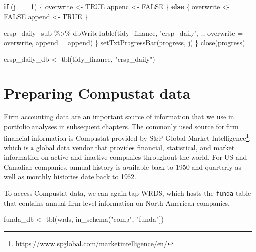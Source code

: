 \documentclass[
]{krantz}
\newenvironment{Shaded}{\begin{snugshade}}{\end{snugshade}}
\newcommand{\AttributeTok}[1]{\textcolor[rgb]{0.61,0.61,0.61}{#1}}
\newcommand{\ConstantTok}[1]{\textcolor[rgb]{0,0,0}{#1}}
\newcommand{\ControlFlowTok}[1]{\textcolor[rgb]{0.27,0.27,0.27}{\textbf{#1}}}
\newcommand{\DecValTok}[1]{\textcolor[rgb]{0.06,0.06,0.06}{#1}}
\newcommand{\FunctionTok}[1]{\textcolor[rgb]{0,0,0}{#1}}
\newcommand{\NormalTok}[1]{#1}
\newcommand{\OtherTok}[1]{\textcolor[rgb]{0.37,0.37,0.37}{#1}}
\newcommand{\SpecialCharTok}[1]{\textcolor[rgb]{0,0,0}{#1}}
\newcommand{\StringTok}[1]{\textcolor[rgb]{0.5,0.5,0.5}{#1}}
\renewcommand{\href}[2]{#2\footnote{\url{#1}}}
\begin{document}
\begin{Shaded}
\begin{Highlighting}[]
    \ControlFlowTok{if}\NormalTok{ (j }\SpecialCharTok{==} \DecValTok{1}\NormalTok{) \{}
\NormalTok{      overwrite }\OtherTok{\textless{}{-}} \ConstantTok{TRUE}
\NormalTok{      append }\OtherTok{\textless{}{-}} \ConstantTok{FALSE}
\NormalTok{    \} }\ControlFlowTok{else}\NormalTok{ \{}
\NormalTok{      overwrite }\OtherTok{\textless{}{-}} \ConstantTok{FALSE}
\NormalTok{      append }\OtherTok{\textless{}{-}} \ConstantTok{TRUE}
\NormalTok{    \}}

\NormalTok{    crsp\_daily\_sub }\SpecialCharTok{\%\textgreater{}\%}
      \FunctionTok{dbWriteTable}\NormalTok{(tidy\_finance, }\StringTok{"crsp\_daily"}\NormalTok{, ., }\AttributeTok{overwrite =}\NormalTok{ overwrite, }\AttributeTok{append =}\NormalTok{ append)}
\NormalTok{  \}}
  \FunctionTok{setTxtProgressBar}\NormalTok{(progress, j)}
\NormalTok{\}}
\FunctionTok{close}\NormalTok{(progress)}

\NormalTok{crsp\_daily\_db }\OtherTok{\textless{}{-}} \FunctionTok{tbl}\NormalTok{(tidy\_finance, }\StringTok{"crsp\_daily"}\NormalTok{)}
\end{Highlighting}
\end{Shaded}

\hypertarget{preparing-compustat-data}{%
\section{Preparing Compustat data}\label{preparing-compustat-data}}

Firm accounting data are an important source of information that we use in portfolio analyses in subsequent chapters. The commonly used source for firm financial information is Compustat provided by \href{https://www.spglobal.com/marketintelligence/en/}{S\&P Global Market Intelligence}, which is a global data vendor that provides financial, statistical, and market information on active and inactive companies throughout the world. For US and Canadian companies, annual history is available back to 1950 and quarterly as well as monthly histories date back to 1962.

To access Compustat data, we can again tap WRDS, which hosts the \texttt{funda} table that contains annual firm-level information on North American companies.

\begin{Shaded}
\begin{Highlighting}[]
\NormalTok{funda\_db }\OtherTok{\textless{}{-}} \FunctionTok{tbl}\NormalTok{(wrds, }\FunctionTok{in\_schema}\NormalTok{(}\StringTok{"comp"}\NormalTok{, }\StringTok{"funda"}\NormalTok{))}
\end{Highlighting}
\end{Shaded}
\end{document}
